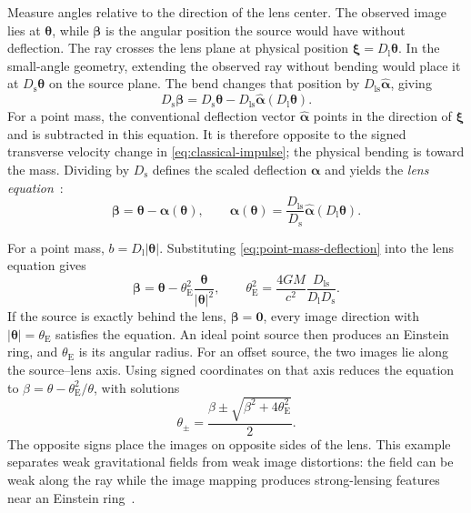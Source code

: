 Measure angles relative to the direction of the lens center. The observed image lies at $\boldsymbol{\theta}$, while $\boldsymbol{\beta}$ is the angular position the source would have without deflection. The ray crosses the lens plane at physical position $\boldsymbol{\xi}=D_{\mathrm{l}}\boldsymbol{\theta}$. In the small-angle geometry, extending the observed ray without bending would place it at $D_{\mathrm{s}}\boldsymbol{\theta}$ on the source plane. The bend changes that position by $D_{\mathrm{ls}}\widehat{\boldsymbol{\alpha}}$, giving
\begin{equation}
    D_{\mathrm{s}}\boldsymbol{\beta}
    =D_{\mathrm{s}}\boldsymbol{\theta}-D_{\mathrm{ls}}\widehat{\boldsymbol{\alpha}}(D_{\mathrm{l}}\boldsymbol{\theta}).
    \label{eq:lens-geometry}
\end{equation}
For a point mass, the conventional deflection vector $\widehat{\boldsymbol{\alpha}}$ points in the direction of $\boldsymbol{\xi}$ and is subtracted in this equation. It is therefore opposite to the signed transverse velocity change in \cref{eq:classical-impulse}; the physical bending is toward the mass. Dividing by $D_{\mathrm{s}}$ defines the scaled deflection $\boldsymbol{\alpha}$ and yields the \emph{lens equation}~\cite{yoo_weak_2026,schneider_weak_2006}:
\begin{equation}
    \boldsymbol{\beta}=\boldsymbol{\theta}-\boldsymbol{\alpha}(\boldsymbol{\theta}),
    \qquad
    \boldsymbol{\alpha}(\boldsymbol{\theta})
    =\frac{D_{\mathrm{ls}}}{D_{\mathrm{s}}}\widehat{\boldsymbol{\alpha}}(D_{\mathrm{l}}\boldsymbol{\theta}).
    \label{eq:scaled-deflection}
\end{equation}

For a point mass, $b=D_{\mathrm{l}}|\boldsymbol{\theta}|$. Substituting \cref{eq:point-mass-deflection} into the lens equation gives
\begin{equation}
    \boldsymbol{\beta}=\boldsymbol{\theta}
    -\theta_{\mathrm{E}}^2\frac{\boldsymbol{\theta}}{|\boldsymbol{\theta}|^2},
    \qquad
    \theta_{\mathrm{E}}^2=\frac{4GM}{c^2}\frac{D_{\mathrm{ls}}}{D_{\mathrm{l}}D_{\mathrm{s}}}.
    \label{eq:einstein-radius}
\end{equation}
If the source is exactly behind the lens, $\boldsymbol{\beta}=\boldsymbol{0}$, every image direction with $|\boldsymbol{\theta}|=\theta_{\mathrm{E}}$ satisfies the equation. An ideal point source then produces an Einstein ring, and $\theta_{\mathrm{E}}$ is its angular radius. For an offset source, the two images lie along the source--lens axis. Using signed coordinates on that axis reduces the equation to $\beta=\theta-\theta_{\mathrm{E}}^2/\theta$, with solutions
\begin{equation}
    \theta_{\pm}=\frac{\beta\pm\sqrt{\beta^2+4\theta_{\mathrm{E}}^2}}{2}.
    \label{eq:point-lens-images}
\end{equation}
The opposite signs place the images on opposite sides of the lens. This example separates weak gravitational fields from weak image distortions: the field can be weak along the ray while the image mapping produces strong-lensing features near an Einstein ring~\cite{yoo_weak_2026,bartelmann_weak_2001}.

